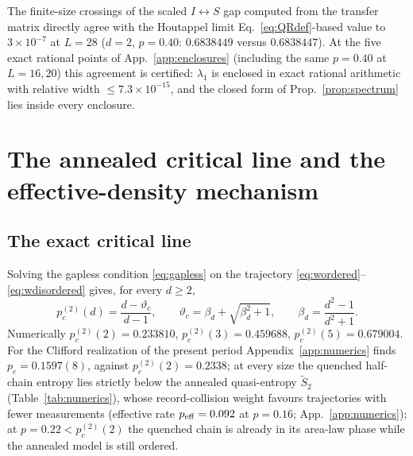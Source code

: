 \documentclass[11pt]{article}
\newcommand{\pctwo}{p_c^{(2)}}
\newcommand{\vth}{\vartheta}
\begin{document}
The finite-size crossings of the scaled $I\leftrightarrow S$ gap computed
from the transfer matrix directly agree with the Houtappel limit
Eq.~\eqref{eq:QRdef}-based value to $3\times10^{-7}$ at $L=28$ ($d=2$,
$p=0.40$: $0.6838449$ versus $0.6838447$).  At the five exact rational
points of App.~\ref{app:enclosures} (including the same $p=0.40$ at
$L=16,20$) this agreement is certified: $\lambda_1$ is enclosed in exact
rational arithmetic with relative width $\le7.3\times10^{-15}$, and the
closed form of Prop.~\ref{prop:spectrum} lies inside every enclosure.

\section{The annealed critical line and the effective-density mechanism}
\label{sec:annealed}

\subsection{The exact critical line}
Solving the gapless condition \eqref{eq:gapless} on the trajectory
\eqref{eq:wordered}--\eqref{eq:wdisordered} gives, for every $d\ge2$,
\begin{equation}
  \boxed{\;\pctwo(d)=\frac{d-\vth_c}{d-1},\qquad
  \vth_c=\beta_d+\sqrt{\beta_d^2+1},\qquad \beta_d=\frac{d^2-1}{d^2+1}.\;}
  \label{eq:pctwo}
\end{equation}
Numerically $\pctwo(2)=0.233810$, $\pctwo(3)=0.459688$,
$\pctwo(5)=0.679004$.  For the Clifford realization of the present period
Appendix~\ref{app:numerics} finds $p_c=0.1597(8)$, against
$\pctwo(2)=0.2338$; at every size the quenched half-chain entropy lies
strictly below the annealed quasi-entropy $\tilde S_2$
(Table~\ref{tab:numerics}), whose record-collision weight favours
trajectories with fewer measurements (effective rate
$p_{\rm eff}=0.092$ at $p=0.16$; App.~\ref{app:numerics}); at
$p=0.22<\pctwo(2)$ the quenched chain is already in its area-law phase while
the annealed model is still ordered.
\end{document}
